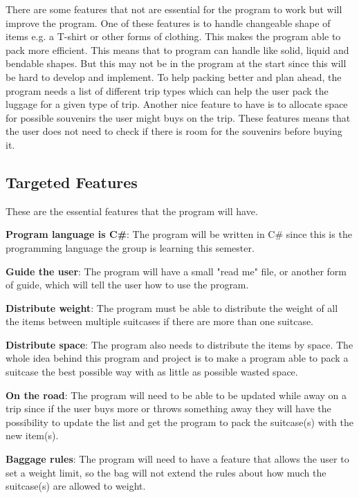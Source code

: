 There are some features that not are essential for the program to work but will improve the program. 
One of these features is to handle changeable shape of items e.g. a T-shirt or other forms of clothing. This makes the program able to pack more efficient. This means that to program can handle like solid, liquid and bendable shapes. But this may not be in the program at the start since this will be hard to develop and implement.
To help packing better and plan ahead, the program needs a list of different trip types which can help the user pack the luggage for a given type of trip.
Another nice feature to have is to allocate space for possible souvenirs the user might buys on the trip. These features means that the user does not need to check if there is room for the souvenirs before buying it.

\subsection{Targeted Features}
These are the essential features that the program will have.\newline

\textbf{Program language is C\#}:
The program will be written in C\# since this is the programming language the group is learning this semester.
\newline

\textbf{Guide the user}:
The program will have a small "read me" file, or another form of guide, which will tell the user how to use the program.
\newline

\textbf{Distribute weight}:
The program must be able to distribute the weight of all the items between multiple suitcases if there are more than one suitcase.
\newline

\textbf{Distribute space}:
The program also needs to distribute the items by space. The whole idea behind this program and project is to make a program able to pack a suitcase the best possible way with as little as possible wasted space.
\newline

\textbf{On the road}:
The program will need to be able to be updated while away on a trip since if the user buys more or throws something away they will have the possibility to update the list and get the program to pack the suitcase(s) with the new item(s).
\newline

\textbf{Baggage rules}:
The program will need to have a feature that allows the user to set a weight limit, so the bag will not extend the rules about how much the suitcase(s) are allowed to weight.
\newline

